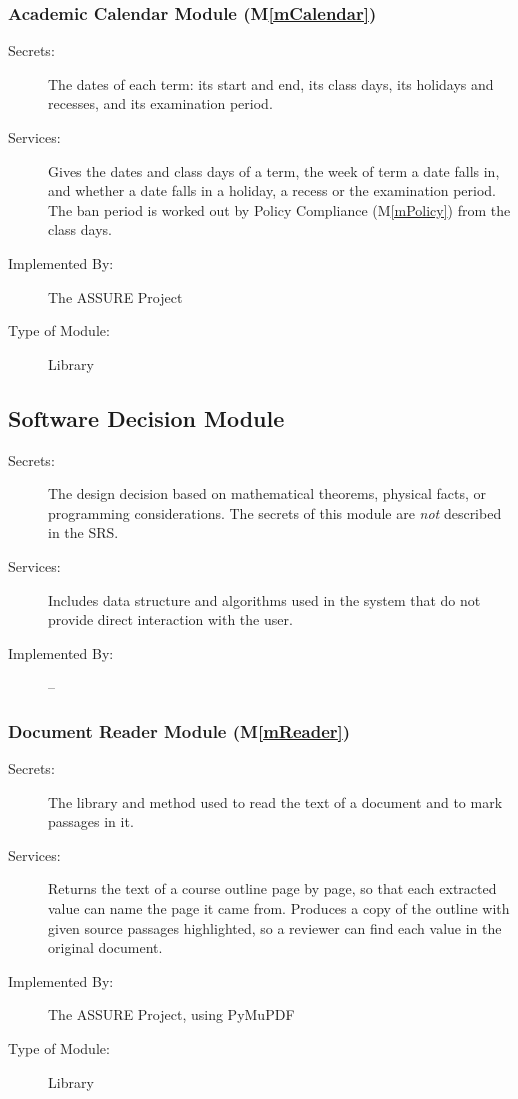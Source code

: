 \documentclass[12pt, titlepage]{article}
\newcommand{\sysname}{The ASSURE Project}
\newcommand{\mref}[1]{M\ref{#1}}
\begin{document}
\subsubsection{Academic Calendar Module (\mref{mCalendar})} \label{SecMD-mCalendar}

\begin{description}
\item[Secrets:] The dates of each term: its start and end, its class days, its
  holidays and recesses, and its examination period.
\item[Services:] Gives the dates and class days of a term, the week of term a
  date falls in, and whether a date falls in a holiday, a recess or the
  examination period. The ban period is worked out by Policy Compliance
  (\mref{mPolicy}) from the class days.
\item[Implemented By:] \sysname
\item[Type of Module:] Library
\end{description}

\subsection{Software Decision Module} \label{SecMDsd}

\begin{description}
\item[Secrets:] The design decision based on mathematical theorems, physical
  facts, or programming considerations. The secrets of this module are
  \emph{not} described in the SRS.
\item[Services:] Includes data structure and algorithms used in the system that
  do not provide direct interaction with the user. 
\item[Implemented By:] --
\end{description}

\subsubsection{Document Reader Module (\mref{mReader})} \label{SecMD-mReader}

\begin{description}
\item[Secrets:] The library and method used to read the text of a document
  and to mark passages in it.
\item[Services:] Returns the text of a course outline page by page, so that
  each extracted value can name the page it came from. Produces a copy of the
  outline with given source passages highlighted, so a reviewer can find each
  value in the original document.
\item[Implemented By:] \sysname, using PyMuPDF~\citep{PyMuPDF}
\item[Type of Module:] Library
\end{description}
\end{document}

